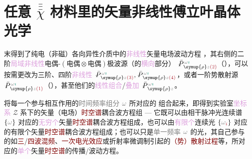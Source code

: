 \chapter{任意 \texorpdfstring{$\bar{\bar{\bar{\chi}}}$}{$\bar{\bar{\bar{\text{χ}}}}$} 材料里的矢量非线性傅立叶晶体光学}\label{chap:NFCO}

 末得到了\textcolor{PineGreen}{纯电（非磁）各向异性}介质中的\textcolor{Plum}{非线性}矢量电场波动方程 ，其右侧的二阶\textcolor{Plum}{局域}\textcolor{Plum}{非线性}\textcolor{NavyBlue}{电偶-$(\text{电偶}\otimes\text{电偶})$}极\textcolor{NavyBlue}{波源}（的\textcolor{Plum}{横向}部分） $\Xint{\mathcolor{gray}{-}}{25}{\bar{P}}^{\;\! \mathcolor{gray}{\omega} \textcolor{PineGreen}{\imath}}_{\;\! \symup{\rho} \mathcolor{gray}{z} \textcolor{Maroon}{(2)}}$（），可以按需更改为三阶、四阶\textcolor{Plum}{非线性} $\Xint{\mathcolor{gray}{-}}{25}{\bar{P}}^{\;\! \mathcolor{gray}{\omega} \textcolor{PineGreen}{\imath}}_{\;\! \symup{\rho} \mathcolor{gray}{z} \textcolor{Maroon}{(3)}}, \Xint{\mathcolor{gray}{-}}{25}{\bar{P}}^{\;\! \mathcolor{gray}{\omega} \textcolor{PineGreen}{\imath}}_{\;\! \symup{\rho} \mathcolor{gray}{z} \textcolor{Maroon}{(4)}}$，或者一阶\textcolor{NavyBlue}{势散射}源 $\Xint{\mathcolor{gray}{-}}{25}{\bar{P}}^{\;\! \mathcolor{gray}{\omega} \textcolor{PineGreen}{\imath}}_{\;\! \symup{\rho} \mathcolor{gray}{z} \textcolor{Maroon}{(1)}}$（），甚至他们的\textcolor{Plum}{线性组合}/\textcolor{Plum}{叠加} $\Xint{\mathcolor{gray}{-}}{25}{\bar{P}}^{\;\! \mathcolor{gray}{\omega} \textcolor{PineGreen}{\imath}}_{\;\! \symup{\rho} \mathcolor{gray}{z}}$。

将每一个参与相互作用的\textcolor{gray}{时间频率组分} $\mathcolor{gray}{\omega}$ 所对应的  组合起来，即得到\textcolor{PineGreen}{实验室}\textcolor{Plum}{坐标系} \textcolor{PineGreen}{$\mathcal{Z}$ 系}下的矢量（电场）\textcolor{Maroon}{时空谱}耦合波方程组 --- 它既可以由相干\textcolor{NavyBlue}{脉冲光连续谱} $\{ \mathcolor{gray}{\omega} \}$ 对应的\textcolor{Plum}{无穷个}矢量\textcolor{Maroon}{时空谱}耦合波方程组成，也可以由\textcolor{Plum}{有限个}\textcolor{NavyBlue}{连续光} $\{ \mathcolor{gray}{\omega}_{\textcolor{Maroon}{i}} \}$ 对应的有限个矢量\textcolor{Maroon}{时空谱}耦合波方程组成；也可以只是\textcolor{gray}{单一频率} $\mathcolor{gray}{\omega}$ 的光，其自己参与的如\textcolor{Maroon}{三}/\textcolor{Maroon}{四波混频}、\textcolor{Maroon}{一次电光效应}或\textcolor{PineGreen}{折射率微调制}引起的\textcolor{Maroon}{（势）散射过程}等，所对应的\textcolor{Plum}{单个}矢量\textcolor{Maroon}{时空谱}的传播/波动方程。

